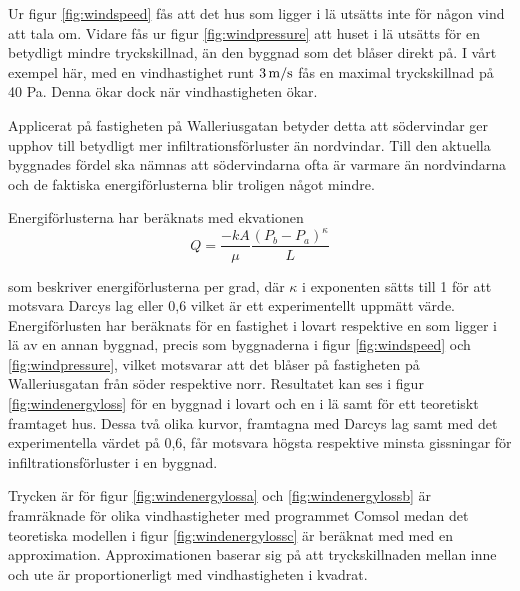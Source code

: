 Ur figur \ref{fig:windspeed} fås att det hus som ligger i lä utsätts inte för någon vind att tala om. Vidare fås ur figur \ref{fig:windpressure} att huset i lä utsätts för en betydligt mindre tryckskillnad, än den byggnad som det blåser direkt på. I vårt exempel här, med en vindhastighet runt $\unit[3]{m/s}$ fås en maximal tryckskillnad på 40 Pa. Denna ökar dock när vindhastigheten ökar.

Applicerat på fastigheten på Walleriusgatan betyder detta att södervindar ger upphov till betydligt mer infiltrationsförluster än nordvindar. Till den aktuella byggnades fördel ska nämnas att södervindarna ofta är varmare än nordvindarna och de faktiska energiförlusterna blir troligen något mindre.


Energiförlusterna har beräknats med ekvationen
\begin{equation}
Q=\frac{-kA}{\mu} \frac{(P_b - P_a)^\kappa}{L} 
\end{equation}

som beskriver energiförlusterna per grad, där $\kappa$ i exponenten sätts till 1 för att motsvara Darcys lag eller 0,6 vilket är ett experimentellt uppmätt värde. Energiförlusten har beräknats för en fastighet i lovart respektive en som ligger i lä av en annan byggnad, precis som byggnaderna i figur \ref{fig:windspeed} och \ref{fig:windpressure}, vilket motsvarar att det blåser på fastigheten på Walleriusgatan från söder respektive norr. Resultatet kan ses i figur \ref{fig:windenergyloss} för en byggnad i lovart och en i lä samt för ett teoretiskt framtaget hus. Dessa två olika kurvor, framtagna med Darcys lag samt med det experimentella värdet på 0,6, får motsvara högsta respektive minsta gissningar för infiltrationsförluster i en byggnad. 

Trycken är för figur \ref{fig:windenergylossa} och \ref{fig:windenergylossb} är framräknade för olika vindhastigheter med programmet Comsol medan det teoretiska modellen i figur \ref{fig:windenergylossc} är beräknat med med en approximation. Approximationen baserar sig på att tryckskillnaden mellan inne och ute är proportionerligt med vindhastigheten i kvadrat.

